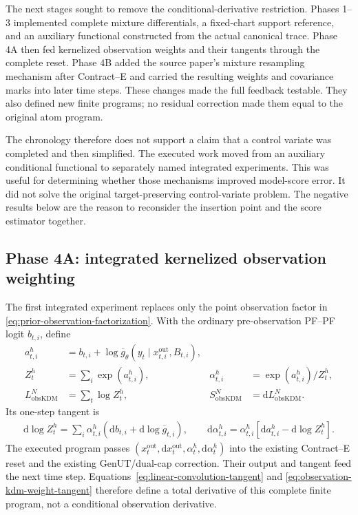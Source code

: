 \documentclass[11pt]{article}
\newcommand{\dd}{\mathrm{d}}
\newcommand{\GenUT}{\ensuremath{\mathrm{GenUT}}}
\begin{document}
The next stages sought to remove the conditional-derivative restriction.
Phases 1--3 implemented complete mixture differentials, a fixed-chart support
reference, and an auxiliary functional constructed from the actual canonical
trace. Phase 4A then fed kernelized observation weights and their tangents
through the complete reset. Phase 4B added the source paper's mixture
resampling mechanism after Contract--E and carried the resulting weights and
covariance marks into later time steps. These changes made the full feedback
testable. They also defined new finite programs; no residual correction made
them equal to the original atom program.

The chronology therefore does not support a claim that a control variate was
completed and then simplified. The executed work moved from an auxiliary
conditional functional to separately named integrated experiments. This was
useful for determining whether those mechanisms improved model-score error.
It did not solve the original target-preserving control-variate problem.
The negative results below are the reason to reconsider the insertion point
and the score estimator together.


\subsection{Phase 4A: integrated kernelized observation weighting}

The first integrated experiment replaces only the point observation factor in
\eqref{eq:prior-observation-factorization}.  With the ordinary
pre-observation PF--PF logit $b_{t,i}$, define
\begin{align}
 a^h_{t,i}&=b_{t,i}+\log\overline g_\theta(
   y_t\mid x_{t,i}^{\mathrm{out}},B_{t,i}),\\
 Z^h_t&=\sum_i\exp(a^h_{t,i}), &
 \alpha^h_{t,i}&=\exp(a^h_{t,i})/Z^h_t,\\
 L_{\mathrm{obsKDM}}^N&=\sum_t\log Z^h_t, &
 S_{\mathrm{obsKDM}}^N&=\dd L_{\mathrm{obsKDM}}^N.
 \label{eq:observation-kdm-program}
\end{align}
Its one-step tangent is
\begin{align}
 \dd\log Z^h_t
 =\sum_i\alpha^h_{t,i}
   \left(\dd b_{t,i}+\dd\log\overline g_{t,i}\right),\qquad
 \dd\alpha^h_{t,i}
 =\alpha^h_{t,i}\left[
   \dd a^h_{t,i}-\dd\log Z^h_t\right].
 \label{eq:observation-kdm-weight-tangent}
\end{align}
The executed program passes $(x_t^{\mathrm{out}},\dd x_t^{\mathrm{out}},
\alpha_t^h,\dd\alpha_t^h)$ into the existing Contract--E reset and the
existing \GenUT{}/dual-cap correction.  Their output and tangent feed the next
time step.  Equations~\eqref{eq:linear-convolution-tangent} and
\eqref{eq:observation-kdm-weight-tangent} therefore define a total derivative
of this complete finite program, not a conditional observation derivative.
\end{document}
